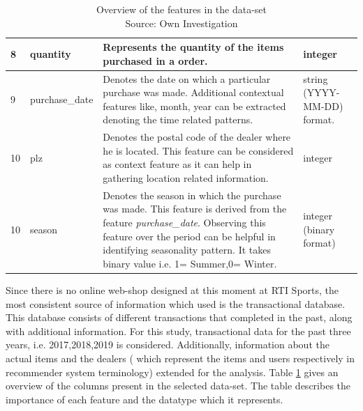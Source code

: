 \begin{table}
\begin{tabular}{ |m{0.5cm}| m{3cm} | m{8cm}| m{2cm} | }
\hline
8 & quantity & Represents the quantity of the items purchased in a order. & integer \\
\hline
9 & purchase{\_}date & Denotes the date on which a particular purchase was made. Additional contextual features like, month, year can be extracted denoting the time related patterns.  & string (YYYY-MM-DD) format. \\
\hline
10 & plz & Denotes the postal code of the dealer where he is located. This feature can be considered as context feature as it can help in gathering location related information.  & integer \\
\hline
10 & season & Denotes the season in which the purchase was made. This feature is derived from the feature \textit{purchase{\_}date}. Observing this feature over the period can be helpful in identifying seasonality pattern. It takes binary value i.e. 1= Summer,0= Winter. & integer (binary format) \\
 \hline
\end{tabular}
\label{table:features}
\caption{Overview of the features in the data-set \\
Source: Own Investigation}
\end{table}

Since there is no online web-shop designed at this moment at RTI Sports, the most consistent source of information which used is the transactional database. This database consists of different transactions that completed in the past, along with additional information. For this study, transactional data for the past three years, i.e. 2017,2018,2019 is considered. Additionally, information about the actual items and the dealers ( which represent the items and users respectively in recommender system terminology) extended for the analysis. Table \ref{table:features} gives an overview of the columns present in the selected data-set. The table describes the importance of each feature and the datatype which it represents. \\ \par

